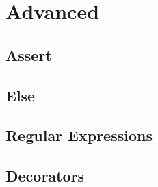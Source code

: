\section{Advanced}

    \subsection{Assert}

    \subsection{Else}

    \subsection{Regular Expressions}

    \subsection{Decorators}
